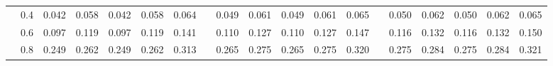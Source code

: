\begin{table}
{\begin{tabular}{llccccccccccccccccc}
 & 0.4 & \cellcolor[HTML]{E3F4F3}0.042 & \cellcolor[HTML]{F1F9DC}0.058 & \cellcolor[HTML]{E3F4F3}0.042 & \cellcolor[HTML]{F1F9DC}0.058 & \cellcolor[HTML]{F4FAD6}0.064 & & \cellcolor[HTML]{E9F6EB}0.049 & \cellcolor[HTML]{F2F9DB}0.061 & \cellcolor[HTML]{E9F6EB}0.049 & \cellcolor[HTML]{F2F9DB}0.061 & \cellcolor[HTML]{F4FAD6}0.065 & & \cellcolor[HTML]{EAF6E9}0.050 & \cellcolor[HTML]{F2F9DA}0.062 & \cellcolor[HTML]{EAF6E9}0.050 & \cellcolor[HTML]{F2F9DA}0.062 & \cellcolor[HTML]{F4FAD6}0.065 \\
 & 0.6 & \cellcolor[HTML]{FFF9B7}0.097 & \cellcolor[HTML]{FFF0A9}0.119 & \cellcolor[HTML]{FFF9B7}0.097 & \cellcolor[HTML]{FFF0A9}0.119 & \cellcolor[HTML]{FFE99D}0.141 & & \cellcolor[HTML]{FFF5B0}0.110 & \cellcolor[HTML]{FFEFA6}0.127 & \cellcolor[HTML]{FFF5B0}0.110 & \cellcolor[HTML]{FFEFA6}0.127 & \cellcolor[HTML]{FFE89C}0.147 & & \cellcolor[HTML]{FFF3AC}0.116 & \cellcolor[HTML]{FFEDA4}0.132 & \cellcolor[HTML]{FFF3AC}0.116 & \cellcolor[HTML]{FFEDA4}0.132 & \cellcolor[HTML]{FFE79B}0.150 \\
 & 0.8 & \cellcolor[HTML]{FEC374}0.249 & \cellcolor[HTML]{FEBF71}0.262 & \cellcolor[HTML]{FEC374}0.249 & \cellcolor[HTML]{FEBF71}0.262 & \cellcolor[HTML]{FDB164}0.313 & & \cellcolor[HTML]{FEC072}0.265 & \cellcolor[HTML]{FEBD6F}0.275 & \cellcolor[HTML]{FEC072}0.265 & \cellcolor[HTML]{FEBD6F}0.275 & \cellcolor[HTML]{FDB264}0.320 & & \cellcolor[HTML]{FEBE70}0.275 & \cellcolor[HTML]{FEBB6D}0.284 & \cellcolor[HTML]{FEBE70}0.275 & \cellcolor[HTML]{FEBB6D}0.284 & \cellcolor[HTML]{FDB264}0.321 \\
\hline
\hline
\end{tabular}%
}
\end{table}

